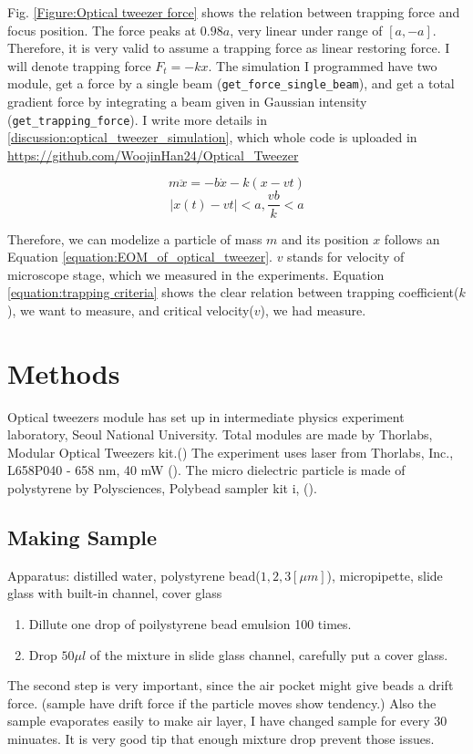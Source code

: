 \documentclass{article}
\begin{document}
Fig. \ref{Figure:Optical tweezer force} shows the relation between trapping force and focus position. The force peaks at $0.98a$, very linear under range of $[a,-a]$.
Therefore, it is very valid to assume a trapping force as linear restoring force. I will denote trapping force $F_t = -kx$. The simulation I programmed have two module, get a force by a single beam (\verb|get_force_single_beam|), and get a total gradient force by integrating a beam given in Gaussian intensity (\verb|get_trapping_force|).
I write more details in \ref{discussion:optical_tweezer_simulation}, which whole code is uploaded in \url{https://github.com/WoojinHan24/Optical_Tweezer}

\begin{equation}
    m \ddot{x} =-b\dot{x} -k(x-vt)
    \label{equation:EOM_of_optical_tweezer}
\end{equation}
\begin{equation}
    |x(t) - vt| < a ,    \frac{vb}{k} < a 
    \label{equation:trapping criteria}
\end{equation}

Therefore, we can modelize a particle of mass $m$ and its position $x$ follows an Equation \ref{equation:EOM_of_optical_tweezer}. $v$ stands for velocity of microscope stage, which we measured in the experiments.
Equation \ref{equation:trapping criteria} shows the clear relation between trapping coefficient($k$), we want to measure, and critical velocity($v$), we had measure.


\section{Methods}
Optical tweezers module has set up in intermediate physics experiment laboratory, Seoul National University.
Total modules are made by Thorlabs, Modular Optical Tweezers kit.(\cite{opticaltweezermodule})
The experiment uses laser from Thorlabs, Inc., L658P040 - 658 nm, 40 mW (\cite{Laser_spec}).
The micro dielectric particle is made of polystyrene by Polysciences, Polybead sampler kit i, (\cite{polybead_spec}).

\subsection{Making Sample}
\noindent
Apparatus:
distilled water, polystyrene bead($1, 2, 3 [\mu m]$), micropipette, slide glass with built-in channel, cover glass

\begin{enumerate}
    \item Dillute one drop of poilystyrene bead emulsion 100 times.
    \item Drop $50 \mu l$ of the mixture in slide glass channel, carefully put a cover glass.
\end{enumerate}
The second step is very important, since the air pocket might give beads a drift force. (sample have drift force if the particle moves show tendency.)
Also the sample evaporates easily to make air layer, I have changed sample for every 30 minuates.
It is very good tip that enough mixture drop prevent those issues.
\end{document}
